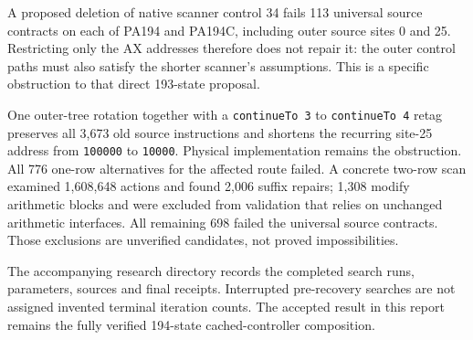 A proposed deletion of native scanner control 34 fails 113 universal source
contracts on each of PA194 and PA194C, including outer source sites 0 and 25.
Restricting only the AX addresses therefore does not repair it: the outer
control paths must also satisfy the shorter scanner's assumptions. This is a
specific obstruction to that direct 193-state proposal.

One outer-tree rotation together with a \texttt{continueTo 3} to
\texttt{continueTo 4} retag preserves all 3,673 old source instructions and
shortens the recurring site-25 address from \texttt{100000} to
\texttt{10000}. Physical implementation remains the obstruction. All 776
one-row alternatives for the affected route failed. A concrete two-row scan
examined 1,608,648 actions and found 2,006 suffix repairs; 1,308 modify
arithmetic blocks and were excluded from validation that relies on unchanged
arithmetic interfaces. All remaining 698 failed the universal source contracts.
Those exclusions are unverified candidates, not proved impossibilities.

The accompanying research directory records the completed search runs,
parameters, sources and final receipts. Interrupted pre-recovery searches are
not assigned invented terminal iteration counts. The accepted result in this
report remains the fully verified 194-state cached-controller composition.
